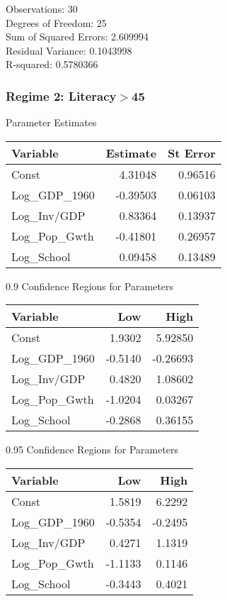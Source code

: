 Observations:                       30 \\
Degrees of Freedom:                 25 \\
Sum of Squared Errors:              2.609994 \\
Residual Variance:                  0.1043998 \\
R-squared:                          0.5780366 \\

\subsubsection*{Regime 2: Literacy$>$45 } 
Parameter Estimates \\
\begin{tabular}{l*{2}{r}}
\toprule
Variable    &   Estimate     &   St Error \\
\midrule 
Const   &    4.31048   &   0.96516 \\
Log\_GDP\_1960   &   -0.39503   &   0.06103 \\
Log\_Inv/GDP   &    0.83364   &   0.13937 \\
Log\_Pop\_Gwth   &   -0.41801   &   0.26957 \\
Log\_School   &    0.09458   &   0.13489 \\
\bottomrule
\end{tabular}
\bigskip 

0.9 Confidence Regions for Parameters \\
\begin{tabular}{l*{2}{r}}
\toprule
Variable    &   Low            &   High \\
\midrule 
Const   &    1.9302   &    5.92850 \\
Log\_GDP\_1960   &   -0.5140   &   -0.26693 \\
Log\_Inv/GDP   &    0.4820   &    1.08602 \\
Log\_Pop\_Gwth   &   -1.0204   &    0.03267 \\
Log\_School   &   -0.2868   &    0.36155 \\
\bottomrule
\end{tabular}
\bigskip 

0.95 Confidence Regions for Parameters \\
\begin{tabular}{l*{2}{r}}
\toprule
Variable    &   Low            &   High \\
\midrule 
Const   &    1.5819   &    6.2292 \\
Log\_GDP\_1960   &   -0.5354   &   -0.2495 \\
Log\_Inv/GDP   &    0.4271   &    1.1319 \\
Log\_Pop\_Gwth   &   -1.1133   &    0.1146 \\
Log\_School   &   -0.3443   &    0.4021 \\
\bottomrule
\end{tabular}
\bigskip 

